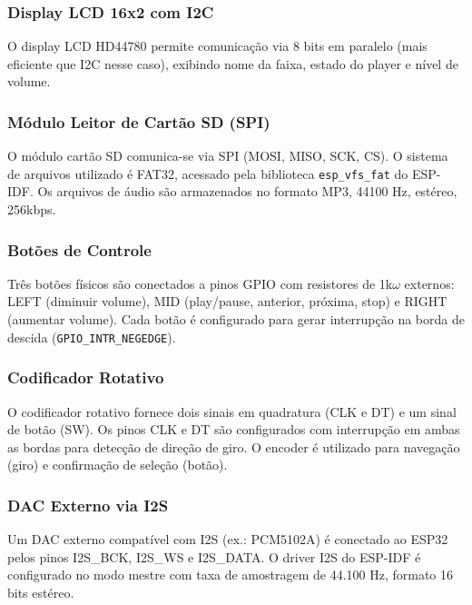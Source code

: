 \documentclass[conference]{IEEEtran}
\begin{document}
\subsubsection{Display LCD 16x2 com I2C}
O display LCD HD44780 permite comunicação via 8 bits em paralelo (mais eficiente que I2C nesse caso), exibindo nome da faixa, estado
do player e nível de volume.

\subsubsection{Módulo Leitor de Cartão SD (SPI)}
O módulo cartão SD comunica-se via SPI (MOSI, MISO, SCK, CS). O
sistema de arquivos utilizado é FAT32, acessado pela biblioteca
\texttt{esp\_vfs\_fat} do ESP-IDF. Os arquivos de áudio são armazenados no
formato MP3, 44100 Hz, estéreo, 256kbps.

\subsubsection{Botões de Controle}
Três botões físicos são conectados a pinos GPIO com resistores de 1k$\omega$
externos: LEFT (diminuir volume), MID (play/pause, anterior, próxima, stop) e RIGHT
(aumentar volume). Cada botão é configurado para gerar interrupção na borda
de descida (\texttt{GPIO\_INTR\_NEGEDGE}).

\subsubsection{Codificador Rotativo}
O codificador rotativo fornece dois sinais em quadratura (CLK e DT)
e um sinal de botão (SW). Os pinos CLK e DT são configurados com interrupção
em ambas as bordas para detecção de direção de giro. O encoder é utilizado
para navegação (giro) e confirmação de seleção (botão).

\subsubsection{DAC Externo via I2S}
Um DAC externo compatível com I2S (ex.: PCM5102A) é conectado ao ESP32 pelos
pinos I2S\_BCK, I2S\_WS e I2S\_DATA. O driver I2S do ESP-IDF é configurado
no modo mestre com taxa de amostragem de 44.100 Hz, formato 16 bits estéreo.
\end{document}
